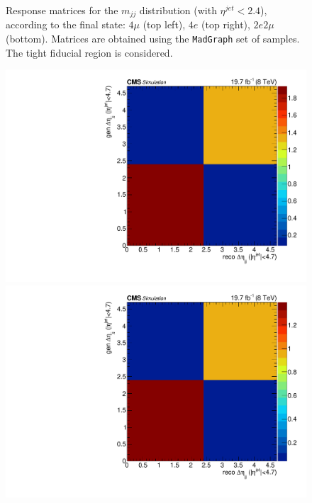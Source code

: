 \begin{figure}[hbtp]
\begin{center}
    \caption{Response matrices for the $m_{jj}$ distribution (with $\eta^{jet}<2.4$), according to the final state:  $4\mu$ (top left), $4e$ (top right), $2e2\mu$  (bottom). Matrices are obtained using the  \texttt{MadGraph} set of samples. The tight fiducial region is considered.} 
    \label{fig:CentralMjj_matrices}
  \end{center}
\end{figure}
\begin{figure}[hbtp]
  \begin{center}
    \includegraphics[width=\cmsFigWidth]{Figures/ResMat_qqggJJ_Deta_ZZTo4m_st_01_fr_Mad}
    \includegraphics[width=\cmsFigWidth]{Figures/ResMat_qqggJJ_Deta_ZZTo4e_st_01_fr_Mad}

\end{center}
\end{figure}

